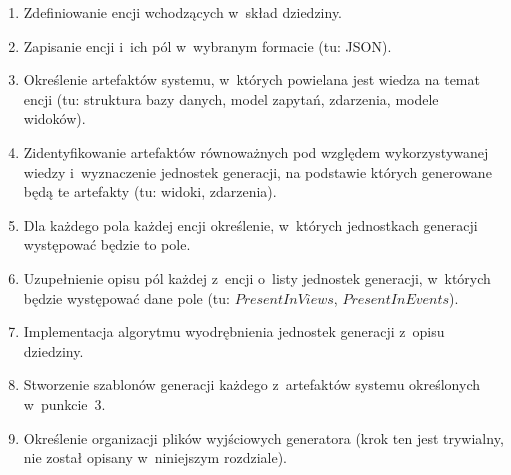\begin{enumerate}
 \item Zdefiniowanie encji wchodzących w~skład dziedziny.
 \item Zapisanie encji i~ich pól w~wybranym formacie (tu: JSON).
 \item Określenie artefaktów systemu, w~których powielana jest wiedza na temat encji (tu: struktura bazy danych, model zapytań, zdarzenia, modele widoków).
 \item Zidentyfikowanie artefaktów równoważnych pod względem wykorzystywanej wiedzy i~wyznaczenie jednostek generacji, na podstawie których generowane będą te artefakty (tu: widoki, zdarzenia).
 \item Dla każdego pola każdej encji określenie, w~których jednostkach generacji występować będzie to pole.
 \item Uzupełnienie opisu pól każdej z~encji o~listy jednostek generacji, w~których będzie występować dane pole (tu: $PresentInViews$, $PresentInEvents$).
 \item Implementacja algorytmu wyodrębnienia jednostek generacji z~opisu dziedziny.
 \item Stworzenie szablonów generacji każdego z~artefaktów systemu określonych w~punkcie~3.
 \item Określenie organizacji plików wyjściowych generatora (krok ten jest trywialny, nie został opisany w~niniejszym rozdziale).
\end{enumerate}
